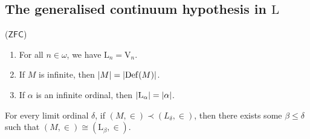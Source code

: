\subsection{The generalised continuum hypothesis in \texorpdfstring{\( \mathrm{L} \)}{L}}
\begin{lemma}
    (\( \mathsf{ZFC} \))
    \begin{enumerate}
        \item For all \( n \in \omega \), we have \( \mathrm{L}_n = \mathrm{V}_n \).
        \item If \( M \) is infinite, then \( \abs{M} = \abs{\operatorname{Def}(M)} \).
        \item If \( \alpha \) is an infinite ordinal, then \( \abs{\mathrm{L}_\alpha} = \abs{\alpha} \).
    \end{enumerate}
\end{lemma}
\begin{lemma}
    For every limit ordinal \( \delta \), if \( (M, \in) \prec (L_\delta, \in) \), then there exists some \( \beta \leq \delta \) such that \( (M, \in) \cong (\mathrm{L}_\beta, \in) \).
\end{lemma}
